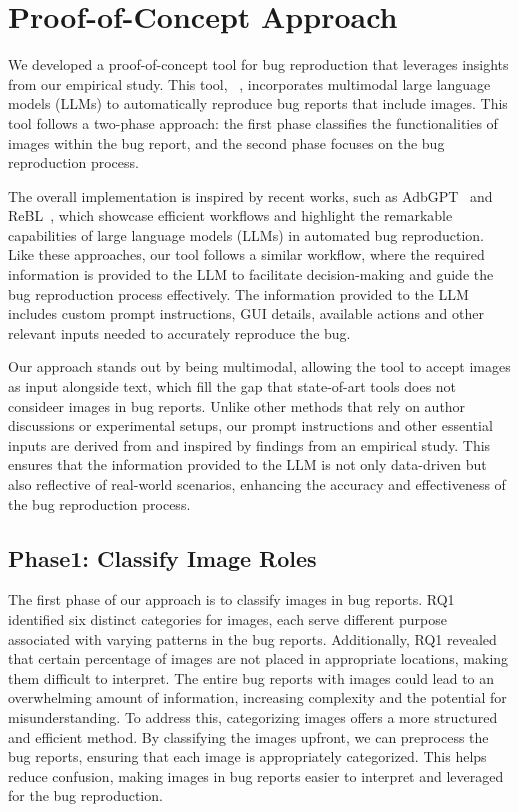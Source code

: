 
\section{Proof-of-Concept Approach} 

We developed a proof-of-concept tool for bug reproduction that leverages insights from our empirical study. This tool, ~\Name{}, incorporates multimodal large language models (LLMs) to automatically reproduce bug reports that include images. 
%
This tool follows a two-phase approach: the first phase classifies the functionalities of images within the bug report, and the second phase focuses on the bug reproduction process.

The overall implementation is inspired by recent works, such as AdbGPT~\cite{feng2024prompting} and ReBL~\cite{wang2024feedback}, which showcase efficient workflows and highlight the remarkable capabilities of large language models (LLMs) in automated bug reproduction. Like these approaches, our tool follows a similar workflow, where the required information is provided to the LLM to facilitate decision-making and guide the bug reproduction process effectively. The information provided to the LLM includes custom prompt instructions, GUI details, available actions and other relevant inputs needed to accurately reproduce the bug.

Our approach stands out by being multimodal, allowing the tool to accept images as input alongside text, which fill the gap that state-of-art tools does not consideer images in bug reports. Unlike other methods that rely on author discussions or experimental setups, our prompt instructions and other essential inputs are derived from and inspired by findings from an empirical study. This ensures that the information provided to the LLM is not only data-driven but also reflective of real-world scenarios, enhancing the accuracy and effectiveness of the bug reproduction process.
%



\subsection{Phase1: Classify Image Roles}
The first phase of our approach is to classify images in bug reports. RQ1 identified six distinct categories for images, each serve different purpose associated with varying patterns in the bug reports. Additionally, RQ1 revealed that  certain percentage of images are not placed in appropriate locations, making them difficult to interpret. The entire bug reports with images could lead to an overwhelming amount of information, increasing complexity and the potential for misunderstanding. To address this, categorizing images offers a more structured and efficient method. By classifying the images upfront, we can preprocess the bug reports, ensuring that each image is appropriately categorized. This helps reduce confusion, making  images in bug reports easier to interpret and leveraged for the bug reproduction.





